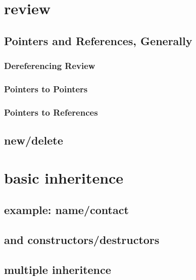 
\begin{frame}
    \titlepage
\end{frame}

\section{review}

\subsection{Pointers and References, Generally}





\subsubsection{Dereferencing Review}



\subsubsection{Pointers to Pointers}



\subsubsection{Pointers to References}

\subsection{new/delete}

\section{basic inheritence}

\subsection{example: name/contact}

\subsection{and constructors/destructors}

\subsection{multiple inheritence}

